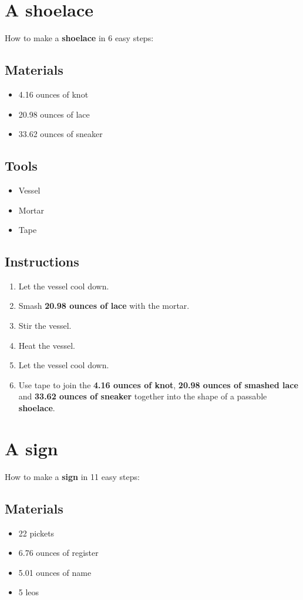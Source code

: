 \documentclass{article}
\begin{document}
\section{A shoelace}How to make a \textbf{shoelace} in 6 easy steps:

\subsection{Materials}\begin{itemize}
\item 
4.16 ounces of knot
\item 
20.98 ounces of lace
\item 
33.62 ounces of sneaker
\end{itemize}
\subsection{Tools}\begin{itemize}
\item 
Vessel
\item 
Mortar
\item 
Tape
\end{itemize}
\subsection{Instructions}\begin{enumerate}
\item 
Let the vessel cool down.
\item 
Smash \textbf{20.98 ounces of lace} with the mortar.
\item 
Stir the vessel.
\item 
Heat the vessel.
\item 
Let the vessel cool down.
\item 
Use tape to join the \textbf{4.16 ounces of knot}, \textbf{20.98 ounces of smashed lace} and \textbf{33.62 ounces of sneaker} together into the shape of a passable \textbf{shoelace}.
\end{enumerate}
\newpage
\section{A sign}How to make a \textbf{sign} in 11 easy steps:

\subsection{Materials}\begin{itemize}
\item 
22 pickets
\item 
6.76 ounces of register
\item 
5.01 ounces of name
\item 
5 leos
\end{itemize}
\end{document}
